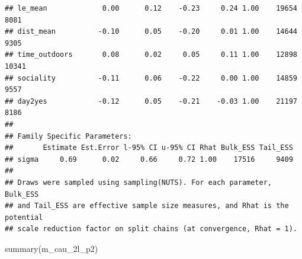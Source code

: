 \documentclass[
]{article}
\newenvironment{Shaded}{\begin{snugshade}}{\end{snugshade}}
\newcommand{\FunctionTok}[1]{\textcolor[rgb]{0.00,0.00,0.00}{#1}}
\newcommand{\NormalTok}[1]{#1}
\begin{document}
\begin{verbatim}
## le_mean             0.00      0.12    -0.23     0.24 1.00    19654     8081
## dist_mean          -0.10      0.05    -0.20     0.01 1.00    14644     9305
## time_outdoors       0.08      0.02     0.05     0.11 1.00    12898    10341
## sociality          -0.11      0.06    -0.22     0.00 1.00    14859     9557
## day2yes            -0.12      0.05    -0.21    -0.03 1.00    21197     8186
## 
## Family Specific Parameters: 
##       Estimate Est.Error l-95% CI u-95% CI Rhat Bulk_ESS Tail_ESS
## sigma     0.69      0.02     0.66     0.72 1.00    17516     9409
## 
## Draws were sampled using sampling(NUTS). For each parameter, Bulk_ESS
## and Tail_ESS are effective sample size measures, and Rhat is the potential
## scale reduction factor on split chains (at convergence, Rhat = 1).
\end{verbatim}

\begin{Shaded}
\begin{Highlighting}[]
\FunctionTok{summary}\NormalTok{(m\_cau\_2l\_p2)}
\end{Highlighting}
\end{Shaded}
\end{document}
